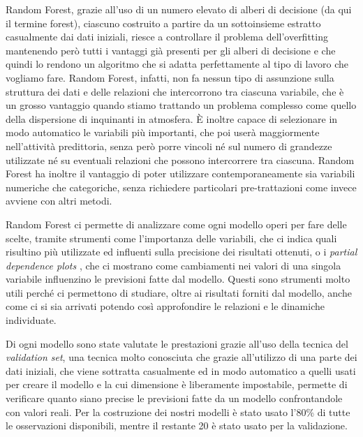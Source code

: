 \documentclass[a4paper]{report}
\begin{document}
Random Forest, grazie all'uso di un numero elevato di alberi di decisione (da qui il termine forest), ciascuno costruito a partire da un sottoinsieme estratto casualmente dai dati iniziali, riesce a controllare il problema dell'overfitting mantenendo però tutti i vantaggi già presenti per gli alberi di decisione e che quindi lo rendono un algoritmo che si adatta perfettamente al tipo di lavoro che vogliamo fare. Random Forest, infatti, non fa nessun tipo di assunzione sulla struttura dei dati e delle relazioni che intercorrono tra ciascuna variabile, che è un grosso vantaggio quando stiamo trattando un problema complesso come quello della dispersione di inquinanti in atmosfera. È inoltre capace di selezionare in modo automatico le variabili più importanti, che poi userà maggiormente nell'attività predittoria, senza però porre vincoli né sul numero di grandezze utilizzate né su eventuali relazioni che possono intercorrere tra ciascuna. Random Forest ha inoltre il vantaggio di poter utilizzare contemporaneamente sia variabili numeriche che categoriche, senza richiedere particolari pre-trattazioni come invece avviene con altri metodi. 

Random Forest ci permette di analizzare come ogni modello operi per fare delle scelte, tramite strumenti come l'importanza delle variabili, che ci indica quali risultino più utilizzate ed influenti sulla precisione dei risultati ottenuti, o i \textit{partial dependence plots}
, che ci mostrano come cambiamenti nei valori di una singola variabile influenzino le previsioni fatte dal modello. Questi sono strumenti molto utili perché ci permettono di studiare, oltre ai risultati forniti dal modello, anche come ci si sia arrivati potendo così approfondire le relazioni e le dinamiche individuate.

Di ogni modello sono state valutate le prestazioni grazie all'uso della tecnica del \textit{validation set}, una tecnica molto conosciuta che grazie all'utilizzo di una parte dei dati iniziali, che viene sottratta casualmente ed in modo automatico a quelli usati per creare il modello e la cui dimensione è liberamente impostabile, permette di verificare quanto siano precise le previsioni fatte da un modello confrontandole con valori reali. Per la costruzione dei nostri modelli è stato usato l'80\% di tutte le osservazioni disponibili, mentre il restante 20 è stato usato per la validazione.
\end{document}
